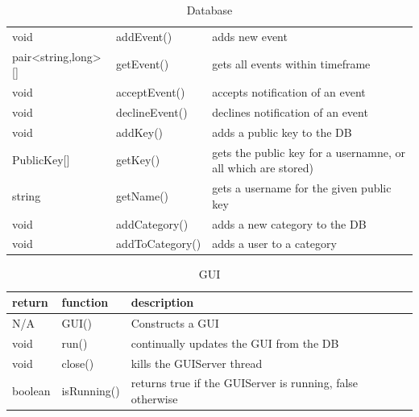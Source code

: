 \begin{table}[h]
\begin{tabular}{p{3cm}p{3cm}p{9cm}}
    void                & addEvent()     & adds new event\\
    pair<string,long>[] & getEvent()     & gets all events within timeframe\\
    void                & acceptEvent()  & accepts notification of an event\\
    void                & declineEvent() & declines notification of an event\\
    
    void        & addKey()  & adds a public key to the DB\\
    PublicKey[] & getKey()  & gets the public key for a usernamne, or all which are stored)\\
    string      & getName() & gets a username for the given public key\\

    void & addCategory()   & adds a new category to the DB\\
    void & addToCategory() & adds a user to a category\\
    \end{tabular}
    \caption{Database}
\end{table}

\begin{table}[h]
    \centering
    \begin{tabular}{p{1cm}p{2.6cm}p{9cm}}
    return  & function    & description\\ \hline
    N/A     & GUI()       & Constructs a GUI\\
    void    & run()       & continually updates the GUI from the DB\\
    void    & close()     & kills the GUIServer thread\\
    boolean & isRunning() & returns true if the GUIServer is running, false otherwise\\
    \end{tabular}
    \caption{GUI}
\end{table}

